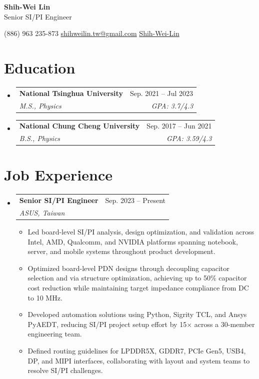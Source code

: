\documentclass[letterpaper,11pt]{article}
\makeatletter
\newcommand{\resumeItem}[1]{  \item{    {#1 \vspace{-2.5pt}}  }}
\newcommand{\resumeSubheading}[4]{  \vspace{-2pt}\item    \begin{tabular*}{0.97\textwidth}[t]{l@{\extracolsep{\fill}}r}      \textbf{#1} & #2 \\      \textit{\small #3} & \textit{\small #4} \\    \end{tabular*}\vspace{-8pt}}
\newcommand{\resumeSubHeadingListStart}{\begin{itemize}[leftmargin=0.15in, label={}]}
\newcommand{\resumeSubHeadingListEnd}{\end{itemize}}
\newcommand{\resumeItemListStart}{\begin{itemize}}
\newcommand{\resumeItemListEnd}{\end{itemize}\vspace{-2pt}}
\makeatother
\begin{document}
\begin{center}
    \textbf{\Huge Shih-Wei Lin} \\
    \vspace{2mm}
     Senior SI/PI Engineer
\end{center}

\vspace{4mm}

\begin{center}
     (886) 963 235-873 \hspace{2cm}
     \href{mailto:shihweilin.tw@gmail.com}{shihweilin.tw@gmail.com} \hspace{2cm}
     \href{https://www.linkedin.com/in/shih-wei-lin-b02b5b236/}{Shih-Wei-Lin}
\end{center}

\section{Education}
\resumeSubHeadingListStart
    \resumeSubheading
        {National Tsinghua University}{Sep. 2021 -- Jul 2023}
        {M.S., Physics}{GPA: 3.7/4.3}
        \vspace{4pt} %
    \resumeSubheading
        {National Chung Cheng University}{Sep. 2017 -- Jun 2021}
        {B.S., Physics }{GPA: 3.59/4.3}
\resumeSubHeadingListEnd

\section{Job Experience}
\resumeSubHeadingListStart
    \resumeSubheading
        {Senior SI/PI Engineer}{Sep. 2023 -- Present}
        {ASUS, Taiwan}{}
        \resumeItemListStart
            \vspace{4pt} %
            \small
            \resumeItem{Led board-level SI/PI analysis, design optimization, and validation across Intel, AMD, Qualcomm, and NVIDIA platforms spanning notebook, server, and mobile systems throughout product development.}
            \resumeItem{Optimized board-level PDN designs through decoupling capacitor selection and via structure optimization, achieving up to 50\% capacitor cost reduction while maintaining target impedance compliance from DC to 10 MHz.}
            \resumeItem{Developed automation solutions using Python, Sigrity TCL, and Ansys PyAEDT, reducing SI/PI project setup effort by 15$\times$ across a 30-member engineering team.}
            \resumeItem{Defined routing guidelines for LPDDR5X, GDDR7, PCIe Gen5, USB4, DP, and MIPI interfaces, collaborating with layout and system teams to resolve SI/PI challenges.}
        \resumeItemListEnd
\resumeSubHeadingListEnd
\end{document}
